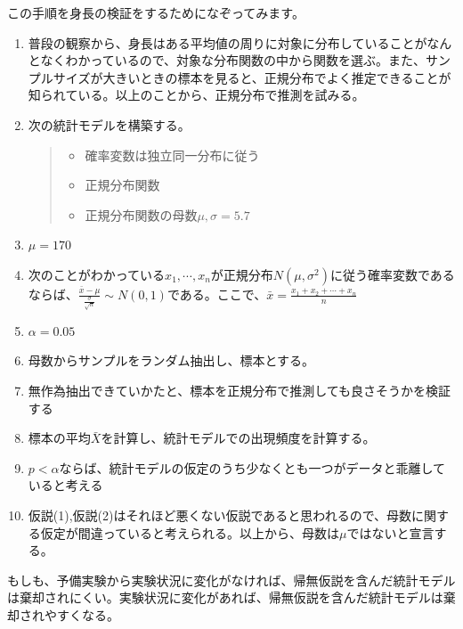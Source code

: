 この手順を身長の検証をするためになぞってみます。
\begin{enumerate}
    \item 普段の観察から、身長はある平均値の周りに対象に分布していることがなんとなくわかっているので、対象な分布関数の中から関数を選ぶ。また、サンプルサイズが大きいときの標本を見ると、正規分布でよく推定できることが知られている。以上のことから、正規分布で推測を試みる。
    \item 次の統計モデルを構築する。
    \begin{quote}
        \begin{itemize}
            \item 確率変数は独立同一分布に従う
            \item 正規分布関数
            \item 正規分布関数の母数$\mu,\sigma=5.7$
        \end{itemize}
    \end{quote}
    \item $\mu=170$
    \item 次のことがわかっている$x_1,\cdots,x_n$が正規分布$N(\mu,\sigma^2)$に従う確率変数であるならば、$\frac{\bar{x}-\mu}{\frac{\sigma}{\sqrt{n}}}\sim N(0,1)$である。ここで、$\bar{x}=\frac{x_1+x_2+\cdots+x_n}{n}$
    \item $\alpha=0.05$
    \item 母数からサンプルをランダム抽出し、標本とする。
    \item 無作為抽出できていかたと、標本を正規分布で推測しても良さそうかを検証する
    \item 標本の平均$\bar{X}$を計算し、統計モデルでの出現頻度を計算する。
    \item $p<\alpha$ならば、統計モデルの仮定のうち少なくとも一つがデータと乖離していると考える
    \item 仮説(1),仮説(2)はそれほど悪くない仮説であると思われるので、母数に関する仮定が間違っていると考えられる。以上から、母数は$\mu$ではないと宣言する。
\end{enumerate}

もしも、予備実験から実験状況に変化がなければ、帰無仮説を含んだ統計モデルは棄却されにくい。実験状況に変化があれば、帰無仮説を含んだ統計モデルは棄却されやすくなる。

